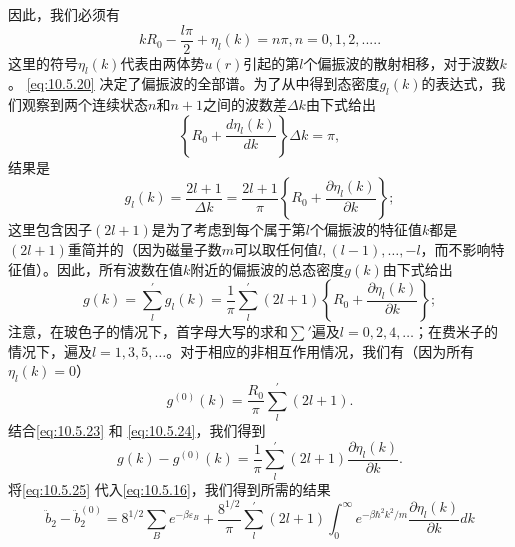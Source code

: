 因此，我们必须有
\begin{equation}\tag{10.5.20}\label{eq:10.5.20}
k R _ { 0 } - \frac { l \pi } { 2 } + \eta _ { l } ( k ) = n \pi ,  n = 0 , 1 , 2 , . . . . .
\end{equation}
这里的符号\(\eta_{l}(k)\)代表由两体势\(u(r)\)引起的第\(l\)个偏振波的散射相移，对于波数\(k\)。
\autoref{eq:10.5.20} 决定了偏振波的全部谱。为了从中得到态密度\(g_{l}(k)\)的表达式，我们观察到两个连续状态\(n\)和\(n+1\)之间的波数差\(\Delta k\)由下式给出
\begin{equation}\tag{10.5.21}\label{eq:10.5.21}
\left\{ R _ { 0 } + \frac { d \eta _ { l } ( k ) } { d k } \right\} \Delta k = \pi ,
\end{equation}
结果是
\begin{equation}\tag{10.5.22}\label{eq:10.5.22}
g _ { l } ( k ) = \frac { 2 l + 1 } { \Delta k } = \frac { 2 l + 1 } { \pi } \left\{ R _ { 0 } + \frac { \partial \eta _ { l } ( k ) } { \partial k } \right\} ;
\end{equation}
这里包含因子\((2l+1)\)是为了考虑到每个属于第\(l\)个偏振波的特征值\(k\)都是\((2l+1)\)重简并的（因为磁量子数\(m\)可以取任何值\(l, (l-1), \ldots, -l\)，而不影响特征值）。因此，所有波数在值\(k\)附近的偏振波的总态密度\(g(k)\)由下式给出
\begin{equation}\tag{10.5.23}\label{eq:10.5.23}
g ( k ) = \sum _ { l } ^{\prime} g _ { l } ( k ) = \frac { 1 } { \pi } \sum _ { l } ^{\prime} ( 2 l + 1 ) \left\{ R _ { 0 } + \frac { \partial \eta _ { l } ( k ) } { \partial k } \right\} ;
\end{equation}
注意，在玻色子的情况下，首字母大写的求和\(\sum'\)遍及\(l=0,2,4,\ldots\)；在费米子的情况下，遍及\(l=1,3,5,\ldots\)。对于相应的非相互作用情况，我们有（因为所有\(\eta_l(k)=0\)）
\begin{equation}\tag{10.5.24}\label{eq:10.5.24}
g ^{( 0 )} ( k ) = \frac { R _ { 0 } } { \pi } \sum _ { l } ^{\prime} ( 2 l + 1 ) .
\end{equation}
结合\autoref{eq:10.5.23} 和 \autoref{eq:10.5.24}，我们得到
\begin{equation}\tag{10.5.25}\label{eq:10.5.25}
g ( k ) - g ^{( 0 )} ( k ) = \frac { 1 } { \pi } \sum _ { l } ^{\prime} ( 2 l + 1 ) \frac { \partial \eta _ { l } ( k ) } { \partial k } .
\end{equation}
将\autoref{eq:10.5.25} 代入\autoref{eq:10.5.16}，我们得到所需的结果
\begin{equation}\tag{10.5.26}\label{eq:10.5.26}
\ddot { b } _ { 2 } - \ddot { b } _ { 2 } ^{( 0 )} = 8 ^{1 / 2} \sum _ { B } e ^{- \beta \varepsilon _ { B} } + \frac { 8 ^{1 / 2} } { \pi } \sum _ { l } ^{\prime} ( 2 l + 1 ) \int _ { 0 } ^{\infty} e ^{- \beta \hbar ^ { 2} k ^{2} / m } \frac { \partial \eta _ { l } ( k ) } { \partial k } d k
\end{equation}
